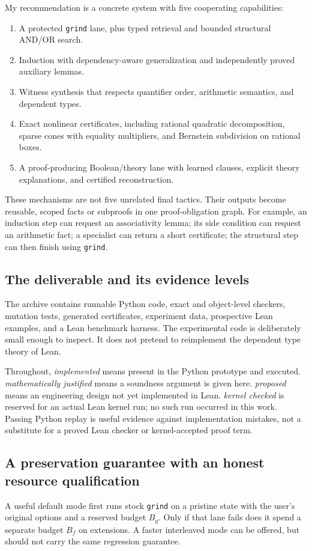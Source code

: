 \documentclass[11pt,letterpaper]{article}
\newcommand{\code}[1]{\texttt{#1}}
\theoremstyle{definition}\newtheorem{definition}[theorem]{Definition}
\theoremstyle{remark}\newtheorem{remark}[theorem]{Remark}
\begin{document}
My recommendation is a concrete system with five cooperating capabilities:
\begin{enumerate}[leftmargin=1.8em,itemsep=2pt]
\item A protected \code{grind} lane, plus typed retrieval and bounded structural AND/OR search.
\item Induction with dependency-aware generalization and independently proved auxiliary lemmas.
\item Witness synthesis that respects quantifier order, arithmetic semantics, and dependent types.
\item Exact nonlinear certificates, including rational quadratic decomposition, sparse cones with equality multipliers, and Bernstein subdivision on rational boxes.
\item A proof-producing Boolean/theory lane with learned clauses, explicit theory explanations, and certified reconstruction.
\end{enumerate}
These mechanisms are not five unrelated final tactics. Their outputs become reusable, scoped facts or subproofs in one proof-obligation graph. For example, an induction step can request an associativity lemma; its side condition can request an arithmetic fact; a specialist can return a short certificate; the structural step can then finish using \code{grind}.

\subsection{The deliverable and its evidence levels}
The archive contains runnable Python code, exact and object-level checkers, mutation tests, generated certificates, experiment data, prospective Lean examples, and a Lean benchmark harness. The experimental code is deliberately small enough to inspect. It does not pretend to reimplement the dependent type theory of Lean.

Throughout, \emph{implemented} means present in the Python prototype and executed. \emph{mathematically justified} means a soundness argument is given here. \emph{proposed} means an engineering design not yet implemented in Lean. \emph{kernel checked} is reserved for an actual Lean kernel run; no such run occurred in this work. Passing Python replay is useful evidence against implementation mistakes, not a substitute for a proved Lean checker or kernel-accepted proof term.

\subsection{A preservation guarantee with an honest resource qualification}
A useful default mode first runs stock \code{grind} on a pristine state with the user's original options and a reserved budget $B_g$. Only if that lane fails does it spend a separate budget $B_f$ on extensions. A faster interleaved mode can be offered, but should not carry the same regression guarantee.
\end{document}
